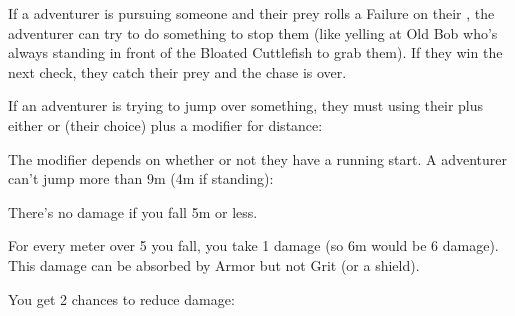 {  If a adventurer is pursuing someone and their prey rolls a Failure on their \MD, the adventurer can try to do something to stop them (like yelling at Old Bob who's always standing in front of the Bloated Cuttlefish to grab them).  If they win the next check, they catch their prey and the chase is over.



  If an adventurer is trying to jump over something, they must \RO using their \MD plus either \VIG or \DEX (their choice) plus a modifier for distance:


  The modifier depends on whether or not they have a running start. A adventurer can't jump more than 9m (4m if standing):



  There's no damage if you fall 5m or less.  

  For every meter over 5 you fall, you take 1 damage (so 6m would be 6 damage).  This damage can be absorbed by Armor but not Grit (or a shield).  

  You get 2 chances to reduce damage:

}
